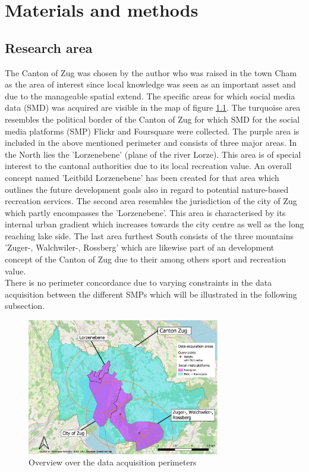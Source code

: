 \chapter{Materials and methods} \label{material_methods}

\section{Research area} \label{research_area}
The Canton of Zug was chosen by the author who was raised in the town Cham as the area of interest since local knowledge was seen as an important asset and due to the manageable spatial extend. The specific areas for which social media data (SMD) was acquired are visible in the map of figure \ref{fig:research_area}. The turquoise area resembles the political border of the Canton of Zug for which SMD for the social media platforms (SMP) Flickr and Foursquare were collected. The purple area is included in the above mentioned perimeter and consists of three major areas. In the North lies the 'Lorzenebene' (plane of the river Lorze). This area is of special interest to the cantonal authorities due to its local recreation value. An overall concept named 'Leitbild Lorzenebene'  \parencite{BaudirektiondesKantonsZug2012} has been created for that area which outlines the future development goals also in regard to potential nature-based recreation services. The second area resembles the jurisdiction of the city of Zug which partly encompasses the 'Lorzenebene'. This area is characterised by its internal urban gradient which increases towards the city centre as well as the long reaching lake side. The last area furthest South consists of the three mountains 'Zuger-, Walchwiler-, Rossberg' which are likewise part of an development concept \parencite{Berchtold2011} of the Canton of Zug due to their among others sport and recreation value. \\
There is no perimeter concordance due to varying constraints in the data acquisition between the different SMPs which will be illustrated in the following subsection.

\begin{figure}[h]
   \centering
   \includegraphics[width=0.75\textwidth]{img/overview_research_area_w_Lorzenebene}
   \caption{Overview over the data acquisition perimeters}
   \label{fig:research_area}
\end{figure}


